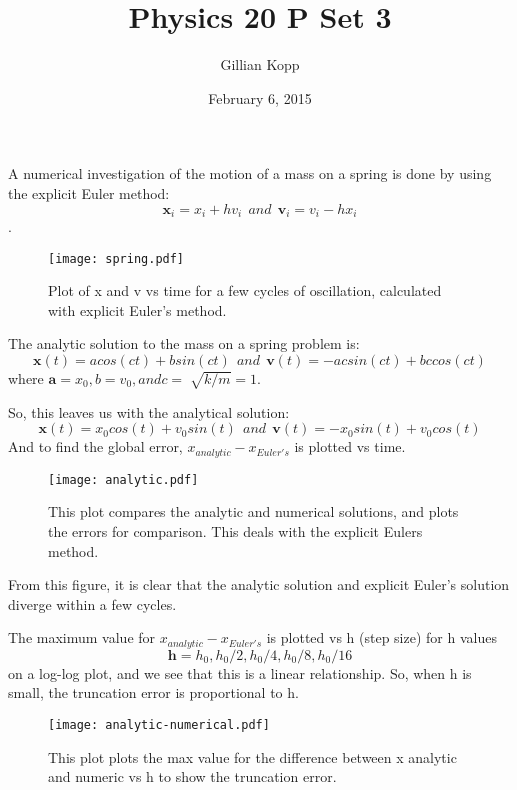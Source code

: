 \documentclass[letterpaper,ams,secnumarabic,balancelastpage,amsmath,amssymb,nofootinbib]{revtex4}
\begin{document}
\title{Physics 20 P Set 3}
\author{Gillian Kopp} 
\date{February 6, 2015}
	
\maketitle

\begin{enumerate}
{\large\item \textbf{}}
A numerical investigation of the motion of a mass on a spring is done by using the explicit Euler method:
$$
\mathbf x_{i} = x_{i} + hv_{i}
~~and~~
\mathbf v_{i} = v_{i} - hx_{i}
$$.

\begin{figure}[h]
\texttt{[image: spring.pdf]}
\caption{Plot of x and v vs time for a few cycles of oscillation, calculated with explicit Euler's method.}
\end{figure}


{\large\item \textbf{}}
The analytic solution to the mass on a spring problem is:
$$
\mathbf x(t) = a cos(ct) + b sin (ct) 
~~and~~
\mathbf v(t) = -ac sin(ct) + bc cos(ct) $$
where 
$\mathbf a = x_{0}, b = v_{0}, and c = \sqrt[]{k/m} = 1 . $


So, this leaves us with the analytical solution:
$$
\mathbf x(t) = x_{0} cos(t) + v_{0} sin(t) 
~~and~~
\mathbf v(t) = -x_{0} sin(t) + v_{0} cos(t) 
$$
And to find the global error, $x_{analytic} - x_{Euler's}$ is plotted vs time.
\begin{figure}[h]
\texttt{[image: analytic.pdf]}
\caption{This plot compares the analytic and numerical solutions, and plots the errors for comparison. This deals with the explicit Eulers method.}
\end{figure}
From this figure, it is clear that the analytic solution and explicit Euler's solution diverge within a few cycles.



{\large\item \textbf{}}
The maximum value for $x_{analytic} - x_{Euler's}$ is plotted vs h (step size) for h values
$$\mathbf h = h_{0}, h_{0}/2, h_{0}/4, h_{0}/8, h_{0}/16 $$
on a log-log plot, and we see that this is a linear relationship. So, when h is small, the truncation error is proportional to h.

\begin{figure}[h]
\texttt{[image: analytic-numerical.pdf]}
\caption{This plot plots the max value for the difference between x analytic and numeric vs h to show the truncation error.}
\end{figure}



\end{enumerate}
\end{document}
